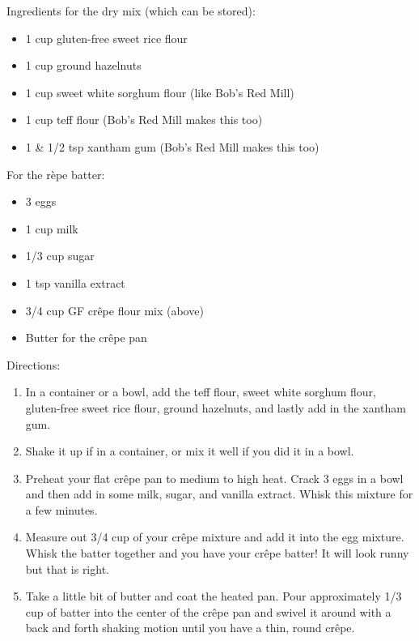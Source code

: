 \documentclass{article}
\begin{document}
%
%
%
%
%

\begin{multicols}{2}
Ingredients for the dry mix (which can be stored):
\begin{itemize}
\item 1 cup gluten-free sweet rice flour
\item 1 cup ground hazelnuts
\item 1 cup sweet white sorghum flour (like Bob's Red Mill)
\item 1 cup teff flour (Bob's Red Mill makes this too)
\item 1 \& 1/2 tsp xantham gum (Bob's Red Mill makes this too)
\end{itemize}
\medskip
For the rèpe batter:
\begin{itemize}
\item 3 eggs
\item 1 cup milk
\item 1/3 cup sugar
\item 1 tsp vanilla extract
\item 3/4 cup GF crêpe flour mix (above)
\item Butter for the crêpe pan

\end{itemize}



\columnbreak

Directions:
\begin{enumerate}
\item In a container or a bowl, add the teff flour, sweet white sorghum flour, gluten-free sweet rice flour, ground hazelnuts, and lastly add in the xantham gum.

\item Shake it up if in a container, or mix it well if you did it in a bowl.

\item Preheat your flat crêpe pan to medium to high heat. Crack 3 eggs in a bowl and then add in some milk, sugar, and vanilla extract. Whisk this mixture for a few minutes.

\item Measure out 3/4 cup of your crêpe mixture and add it into the egg mixture. Whisk the batter together and you have your crêpe batter! It will look runny but that is right.

\item Take a little bit of butter and coat the heated pan. Pour approximately 1/3 cup of batter into the center of the crêpe pan and swivel it around with a back and forth shaking motion until you have a thin, round crêpe.


\end{enumerate}
\end{multicols}
\end{document}
